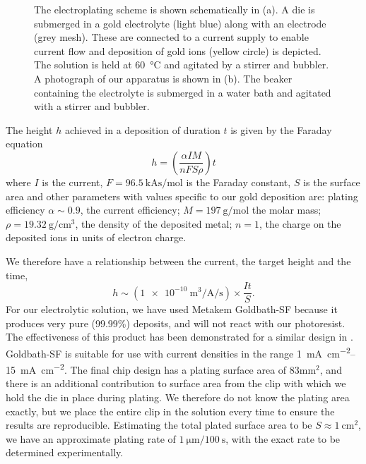 \begin{figure}[phtb]
{
  } %
  \caption[Electroplating scheme and apparatus]{
    The electroplating scheme is shown schematically in (a). A die is submerged in a gold electrolyte
    (light blue) along with an electrode (grey mesh). These are connected to a
    current supply to enable current flow and deposition of gold ions (yellow
    circle)  is depicted. The solution is held at \SI{60}{\celsius} and
    agitated by a stirrer and bubbler. A photograph of our apparatus is shown
    in (b). The beaker containing the electrolyte is submerged in a water bath
    and agitated with a stirrer and bubbler.
  }
  \label{fab:fig:eplate}
\end{figure}

The height $h$ achieved in a deposition of duration $t$ is given by the Faraday
equation~\cite{Ruythooren_2000}
%
\begin{equation}
  h = \left(\frac{\alpha I M}{nFS\rho}\right)t
  \label{fab:eqn:faraday}
\end{equation}
%
where $I$ is the current, $F=\SI{96.5}{\kilo\ampere\second\per\mole}$ is the
Faraday constant, $S$ is the surface area and other parameters with values
specific to our gold deposition are: plating efficiency $\alpha\sim0.9$, the current efficiency;
$M = \SI{197}{\gram\per\mole}$ the molar mass;
$\rho=\SI{19.32}{\gram\per\centi\meter\cubed}$, the density of the deposited
metal; $n=1$, the charge on the deposited ions in units of electron charge.

We therefore have a relationship between the current, the target height and the
time,
%
\begin{equation}
  h \sim \left(
  \SI[per-mode=fraction]{1e-10}{\meter\cubed\per\ampere\per\second} \right)
  \times\frac{It}{S}.
\end{equation}
%
For our electrolytic solution, we have used Metakem Goldbath-SF because it
produces very pure (99.99\%) deposits, and will not react with our photoresist.
The effectiveness of this product has been demonstrated for a similar design in
.
%
Goldbath-SF is suitable for use with current densities in the range
\SIrange{1}{15}{\milli\ampere\per\centi\meter\squared}. The final chip design
has a plating surface area of $83\si{\milli\meter\squared}$, and there is an
additional contribution to surface area from the clip with which we hold the
die in place during plating. We therefore do not know the plating area exactly,
but we place the entire clip in the solution every time to ensure the
results are reproducible. Estimating the total plated surface area to be
$S\approx\SI{1}{\centi\meter\squared}$, we have an approximate plating rate of
$\SI{1}{\micro\meter}/\SI{100}{\second}$, with the exact rate to be determined
experimentally.

